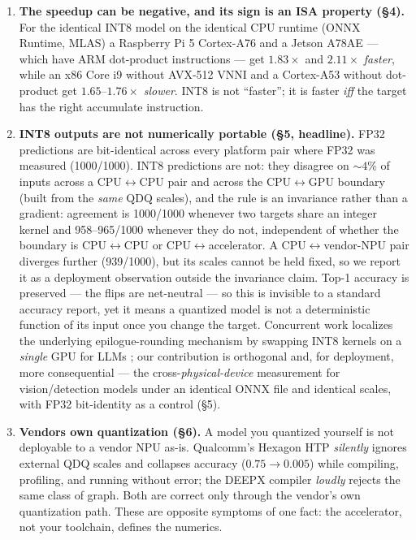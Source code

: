 \documentclass[11pt]{article}
\begin{document}
\begin{enumerate}
\item \textbf{The speedup can be negative, and its sign is an ISA property (\S4).} For the identical INT8 model on the identical CPU runtime (ONNX Runtime, MLAS) a Raspberry Pi 5 Cortex-A76 and a Jetson A78AE --- which have ARM dot-product instructions --- get $1.83\times$ and $2.11\times$ \emph{faster}, while an x86 Core i9 without AVX-512 VNNI and a Cortex-A53 without dot-product get $1.65$--$1.76\times$ \emph{slower}. INT8 is not ``faster''; it is faster \emph{iff} the target has the right accumulate instruction.

\item \textbf{INT8 outputs are not numerically portable (\S5, headline).} FP32 predictions are bit-identical across every platform pair where FP32 was measured (1000/1000). INT8 predictions are not: they disagree on ${\sim}4$\% of inputs across a CPU$\leftrightarrow$CPU pair and across the CPU$\leftrightarrow$GPU boundary (built from the \emph{same} QDQ scales), and the rule is an invariance rather than a gradient: agreement is 1000/1000 whenever two targets share an integer kernel and 958--965/1000 whenever they do not, independent of whether the boundary is CPU$\leftrightarrow$CPU or CPU$\leftrightarrow$accelerator. A CPU$\leftrightarrow$vendor-NPU pair diverges further (939/1000), but its scales cannot be held fixed, so we report it as a deployment observation outside the invariance claim. Top-1 accuracy is preserved --- the flips are net-neutral --- so this is invisible to a standard accuracy report, yet it means a quantized model is not a deterministic function of its input once you change the target. Concurrent work localizes the underlying epilogue-rounding mechanism by swapping INT8 kernels on a \emph{single} GPU for LLMs \citep{chen2026integeralibi}; our contribution is orthogonal and, for deployment, more consequential --- the cross-\emph{physical-device} measurement for vision/detection models under an identical ONNX file and identical scales, with FP32 bit-identity as a control (\S5).

\item \textbf{Vendors own quantization (\S6).} A model you quantized yourself is not deployable to a vendor NPU as-is. Qualcomm's Hexagon HTP \emph{silently} ignores external QDQ scales and collapses accuracy ($0.75 \rightarrow 0.005$) while compiling, profiling, and running without error; the DEEPX compiler \emph{loudly} rejects the same class of graph. Both are correct only through the vendor's own quantization path. These are opposite symptoms of one fact: the accelerator, not your toolchain, defines the numerics.
\end{enumerate}
\end{document}
